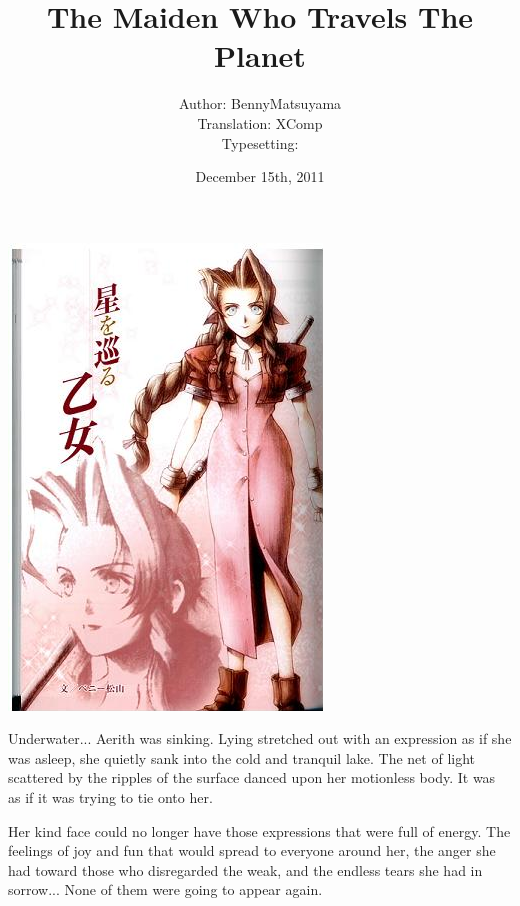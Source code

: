 \documentclass[oneside]{book}
\title{The Maiden Who Travels The Planet}
\author{Author: BennyMatsuyama\\Translation: XComp\\Typesetting: \def\swindlesmccoop{swindlesmccoop.xyz}}
\date{December 15th, 2011}
\begin{document}
\maketitle
\includegraphics[width=\textwidth,height=\textheight,keepaspectratio]{cover.png}

\chaptermark{}
Underwater... Aerith was sinking. Lying stretched out with an expression as if she was asleep, she quietly sank into the cold and tranquil lake. The net of light scattered by the ripples of the surface danced upon her motionless body. It was as if it was trying to tie onto her.

Her kind face could no longer have those expressions that were full of energy. The feelings of joy and fun that would spread to everyone around her, the anger she had toward those who disregarded the weak, and the endless tears she had in sorrow... None of them were going to appear again.
\end{document}
